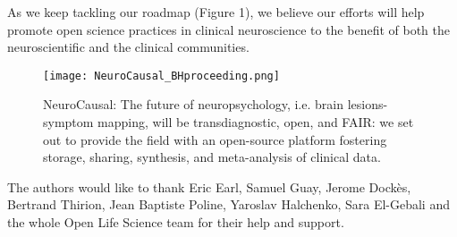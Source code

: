 \documentclass[../main.tex]{subfiles}
\begin{document}
As we keep tackling our roadmap (Figure 1), we believe our efforts will help promote open science practices in clinical neuroscience to the benefit of both the neuroscientific and the clinical communities.


\begin{figure}
	\centering
	\texttt{[image: NeuroCausal\_BHproceeding.png]}
	\caption{NeuroCausal: The future of neuropsychology, i.e. brain lesions-symptom mapping, will be transdiagnostic, open, and FAIR: we set out to provide the field with an open-source platform fostering storage, sharing, synthesis, and meta-analysis of clinical data.
}
	\label{fig:NeuroCausal}
\end{figure}

 The authors would like to thank Eric Earl, Samuel Guay, Jerome Dockès, Bertrand Thirion, Jean Baptiste Poline, Yaroslav Halchenko, Sara El-Gebali and the whole Open Life Science team for their help and support.

\printbibliography
\end{document}
